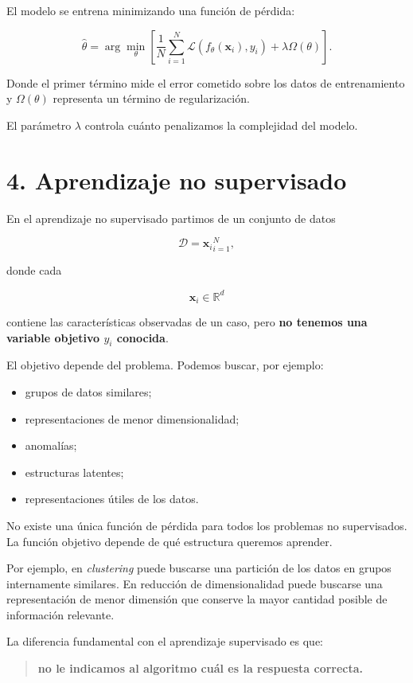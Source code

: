 \documentclass[
  letterpaper,
  DIV=11,
  numbers=noendperiod]{scrartcl}
\providecommand{\tightlist}{%
  \setlength{\itemsep}{0pt}\setlength{\parskip}{0pt}}
\begin{document}
El modelo se entrena minimizando una función de pérdida:

\[
\hat{\theta}
=
\arg\min_{\theta}
\left[
\frac{1}{N}
\sum_{i=1}^{N}
\mathcal{L}
\left(
f_\theta(\mathbf{x}_i),y_i
\right)
+
\lambda\Omega(\theta)
\right].
\]

Donde el primer término mide el error cometido sobre los datos de
entrenamiento y \(\Omega(\theta)\) representa un término de
regularización.

El parámetro \(\lambda\) controla cuánto penalizamos la complejidad del
modelo.

\section{4. Aprendizaje no
supervisado}\label{aprendizaje-no-supervisado}

En el aprendizaje no supervisado partimos de un conjunto de datos

\[
\mathcal{D}={\mathbf{x}_i}_{i=1}^{N},
\]

donde cada

\[
\mathbf{x}_i\in\mathbb{R}^d
\]

contiene las características observadas de un caso, pero \textbf{no
tenemos una variable objetivo \(y_i\) conocida}.

El objetivo depende del problema. Podemos buscar, por ejemplo:

\begin{itemize}
\tightlist
\item
  grupos de datos similares;
\item
  representaciones de menor dimensionalidad;
\item
  anomalías;
\item
  estructuras latentes;
\item
  representaciones útiles de los datos.
\end{itemize}

No existe una única función de pérdida para todos los problemas no
supervisados. La función objetivo depende de qué estructura queremos
aprender.

Por ejemplo, en \emph{clustering} puede buscarse una partición de los
datos en grupos internamente similares. En reducción de dimensionalidad
puede buscarse una representación de menor dimensión que conserve la
mayor cantidad posible de información relevante.

La diferencia fundamental con el aprendizaje supervisado es que:

\begin{quote}
\textbf{no le indicamos al algoritmo cuál es la respuesta correcta.}
\end{quote}
\end{document}
